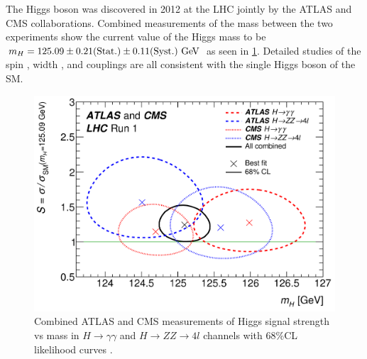 

The Higgs boson was discovered in 2012 at the LHC
jointly by the ATLAS \cite{Aad20121} and CMS \cite{Chatrchyan:2012xdj}
collaborations.
Combined measurements of the mass between the two experiments 
show the current value of the Higgs mass to be 
$m_H = 125.09 \pm 0.21 (\textrm{Stat.}) \pm 0.11 (\textrm{Syst.})\GeV$
\cite{Aad:2015zhl} as seen in \fig\ref{fig:higgs_mass}.
Detailed studies of the spin \cite{Aad2013120,Khachatryan:2014kca},
width \cite{Aad:2015xua,Khachatryan:2014iha},
and couplings \cite{ATLAS-CONF-2015-044} are all consistent
with the single Higgs boson of the SM.

\begin{figure}
\centering
\includegraphics[width=.8\textwidth]{figures/theory/higgs_mass.png}
\caption{Combined ATLAS and CMS 
measurements of Higgs signal strength
vs mass in $H\rightarrow \gamma \gamma$ and $H\rightarrow ZZ\rightarrow 4l$
channels with 68\%CL likelihood curves \cite{Aad:2015zhl}.}
\label{fig:higgs_mass}
\end{figure}

